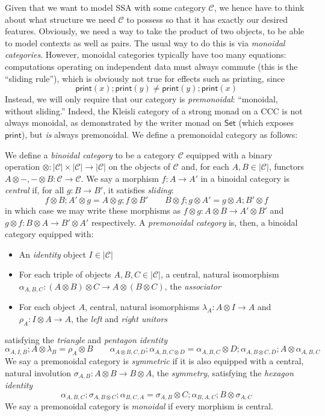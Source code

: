 \documentclass[acmsmall,screen,review]{acmart}
\newcommand{\mc}[1]{\ensuremath{\mathcal{#1}}}
\newcommand{\ms}[1]{\ensuremath{\mathsf{#1}}}
\begin{document}
Given that we want to model SSA with some category $\mc{C}$, we hence have to think about what
structure we need $\mc{C}$ to possess so that it has exactly our desired features.
Obviously, we need a way to take the product of two objects, to be able to model contexts as well as
pairs. The usual way to do this is via \emph{monoidal categories}. However, monoidal categories
typically have too many
equations: computations operating on independent data must always commute
(this is the ``sliding rule''), which is obviously not true for effects such as printing, since
$$
\ms{print}(x) ; \ms{print}(y) \neq \ms{print}(y) ; \ms{print}(x)
$$
Instead, we will only require that our category is \emph{premonoidal}: ``monoidal, without
sliding.'' Indeed, the Kleisli category of a strong monad on a CCC is not always monoidal, as
demonstrated by the writer monad on $\ms{Set}$ (which exposes $\ms{print}$), but \emph{is} always
premonoidal. We define a premonoidal category as follows:
\begin{definition}
  We define a \emph{binoidal category} to be a category $\mc{C}$ equipped with a binary operation
  $\otimes : |\mc{C}| \times |\mc{C}| \to |\mc{C}|$ on the objects of $\mc{C}$ and, for each $A, B
  \in |\mc{C}|$, functors $A \otimes -, - \otimes B : \mc{C} \to \mc{C}$. We say a morphism $f : A
  \to A'$ in a binoidal category is \emph{central} if, for all $g : B \to B'$, it satisfies
  \emph{sliding}:
  $$
  f \otimes B ; A' \otimes g = A \otimes g ; f \otimes B' \qquad
  B \otimes f ; g \otimes A' = g \otimes A ; B' \otimes f
  $$
  in which case we may write these morphisms as $f \otimes g : A \otimes B \to A' \otimes B'$ and $g
  \otimes f : B \otimes A \to B' \otimes A'$ respectively. A \emph{premonoidal category} is, then, a
  binoidal category equipped with:
  \begin{itemize}
    \item An \emph{identity} object $I \in |\mc{C}|$
    \item For each triple of objects $A, B, C \in |\mc{C}|$, a central, natural isomorphism
    $\alpha_{A, B, C} : (A \otimes B) \otimes C \to A \otimes (B \otimes C)$, the \emph{associator}
    \item For each object $A$, central, natural isomorphisms $\lambda_A : A \otimes I \to A$ and
    $\rho_A : I \otimes A \to A$, the \emph{left} and \emph{right unitors}
  \end{itemize}
  satisfying the \emph{triangle} and \emph{pentagon identity}
  $$
  \alpha_{A, I, B} ; A \otimes \lambda_B = \rho_A \otimes B \qquad
  \alpha_{A \otimes B, C, D} ; \alpha_{A, B, C \otimes D}
  = \alpha_{A, B, C} \otimes D ; \alpha_{A, B \otimes C, D} ; A \otimes \alpha_{A, B, C}
  $$
  We say a premonoidal category is \emph{symmetric} if it is also equipped with a central, natural
  involution $\sigma_{A, B} : A \otimes B \to B \otimes A$, the \textit{symmetry}, satisfying the
  \emph{hexagon identity}
  $$
  \alpha_{A, B, C} ; \sigma_{A, B \otimes C} ; \alpha_{B, C, A}
  = \sigma_{A, B} \otimes C ; \alpha_{B, A, C} ; B \otimes \sigma_{A, C}
  $$
  We say a premonoidal category is \emph{monoidal} if every morphism is central.
\end{definition}
\end{document}
